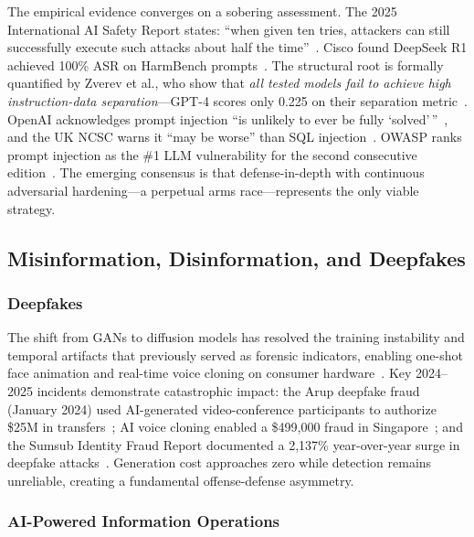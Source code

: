 The empirical evidence converges on a sobering assessment. The 2025 International AI Safety Report states: ``when given ten tries, attackers can still successfully execute such attacks about half the time''~\cite{aisafetyreport2025}. Cisco found DeepSeek R1 achieved 100\% ASR on HarmBench prompts~\cite{cisco2025deepseek}. The structural root is formally quantified by Zverev et al., who show that \emph{all tested models fail to achieve high instruction-data separation}---GPT-4 scores only 0.225 on their separation metric~\cite{zverev2025separation}. OpenAI acknowledges prompt injection ``is unlikely to ever be fully `solved'\,''~\cite{openai2025atlas}, and the UK NCSC warns it ``may be worse'' than SQL injection~\cite{ncsc2025promptinjection}. OWASP ranks prompt injection as the \#1 LLM vulnerability for the second consecutive edition~\cite{owasp2025}. The emerging consensus is that defense-in-depth with continuous adversarial hardening---a perpetual arms race---represents the only viable strategy.


\subsection{Misinformation, Disinformation, and Deepfakes}
\label{sec:threat-misinfo}

\subsubsection{Deepfakes}
\label{sec:threat-deepfake}

The shift from GANs to diffusion models has resolved the training instability and temporal artifacts that previously served as forensic indicators, enabling one-shot face animation and real-time voice cloning on consumer hardware~\cite{pei2024deepfakesurvey}. Key 2024--2025 incidents demonstrate catastrophic impact: the Arup deepfake fraud (January 2024) used AI-generated video-conference participants to authorize \$25M in transfers~\cite{wef2025arup}; AI voice cloning enabled a \$499,000 fraud in Singapore~\cite{brightside2025phishing}; and the Sumsub Identity Fraud Report documented a 2,137\% year-over-year surge in deepfake attacks~\cite{sumsub2024}. Generation cost approaches zero while detection remains unreliable, creating a fundamental offense-defense asymmetry.


\subsubsection{AI-Powered Information Operations}
\label{sec:threat-infoop}

